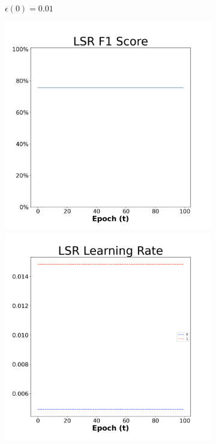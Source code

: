 \begin{figure}[H]
\begin{subfigure}{0.3\textwidth}
  \caption{$\epsilon(0)=0.01$}
\end{subfigure}\hfil %
\begin{subfigure}{0.3\textwidth}
  \includegraphics[width=\linewidth]{images/exper2/NSP/LSR_0.03_f1.png}
  \includegraphics[width=\linewidth]{images/exper2/NSP/LSR_0.03_lr.png}

\end{subfigure}
\end{figure}
